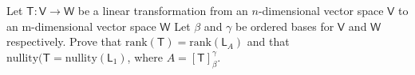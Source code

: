 Let $\mathsf{T}\colon\mathsf{V}\to\mathsf{W}$ be a linear
transformation from an $n$-dimensional vector space $\mathsf{V}$ to an
m-dimensional vector space $\mathsf{W}$  Let $\beta$ and $\gamma$ be
ordered bases for $\mathsf{V}$ and $\mathsf{W}$ respectively. Prove
that $\text{rank}(\mathsf{T}) = \text{rank}(\mathsf{L}_A)$ and that
$\text{nullity}(\mathsf{T} = \text{nullity}(\mathsf{L}_1)$, where $A = [\mathsf{T}]^\gamma_\beta$.
